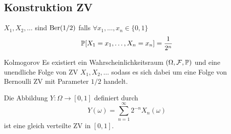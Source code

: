 \subsection{Konstruktion ZV}%
\label{sub:konstruktion_zv}

$X_1, X_2, \ldots$ sind \iid $\text{Ber} (1/2)$ falls $\forall x_1 , \ldots , x_n \in \{0,1\}$
\begin{equation*}
	\mathbb{P} [X_1 = x_1 , \ldots , X_n = x_n] = \frac{1}{2^n} 
\end{equation*}
\begin{theorem}{Kolmogorov}
	Es existiert ein Wahrscheinlichkeitsraum $(\Omega, \mathcal{F} , \mathbb{P})$ und eine unendliche Folge von ZV $X_1 ,X_2 , \ldots$
	sodass es sich dabei um eine Folge von \iid Bernoulli ZV mit Parameter $1/2$ handelt.
\end{theorem}
\begin{prop}
	Die Abbildung $Y : \Omega \rightarrow [0,1]$ definiert durch
	\begin{equation*}
		Y (\omega) = \sum_{n=1}^{\infty} 2^{-n} X_n (\omega)
	\end{equation*}
	ist eine gleich verteilte ZV in $[0,1]$.
\end{prop}
